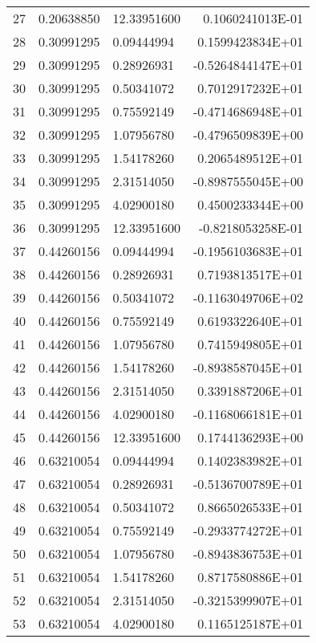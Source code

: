 \begin{longtable}{@{\extracolsep{\fill}}cllr@{}}
27  &  0.20638850  &  12.33951600  &   0.1060241013E-01 \\
28  &  0.30991295  &  0.09444994  &   0.1599423834E+01 \\
29  &  0.30991295  &  0.28926931  &  -0.5264844147E+01 \\
30  &  0.30991295  &  0.50341072  &   0.7012917232E+01 \\
31  &  0.30991295  &  0.75592149  &  -0.4714686948E+01 \\
32  &  0.30991295  &  1.07956780  &  -0.4796509839E+00 \\
33  &  0.30991295  &  1.54178260  &   0.2065489512E+01 \\
34  &  0.30991295  &  2.31514050  &  -0.8987555045E+00 \\
35  &  0.30991295  &  4.02900180  &   0.4500233344E+00 \\
36  &  0.30991295  &  12.33951600  &  -0.8218053258E-01 \\
37  &  0.44260156  &  0.09444994  &  -0.1956103683E+01 \\
38  &  0.44260156  &  0.28926931  &   0.7193813517E+01 \\
39  &  0.44260156  &  0.50341072  &  -0.1163049706E+02 \\
40  &  0.44260156  &  0.75592149  &   0.6193322640E+01 \\
41  &  0.44260156  &  1.07956780  &   0.7415949805E+01 \\
42  &  0.44260156  &  1.54178260  &  -0.8938587045E+01 \\
43  &  0.44260156  &  2.31514050  &   0.3391887206E+01 \\
44  &  0.44260156  &  4.02900180  &  -0.1168066181E+01 \\
45  &  0.44260156  &  12.33951600  &   0.1744136293E+00 \\
46  &  0.63210054  &  0.09444994  &   0.1402383982E+01 \\
47  &  0.63210054  &  0.28926931  &  -0.5136700789E+01 \\
48  &  0.63210054  &  0.50341072  &   0.8665026533E+01 \\
49  &  0.63210054  &  0.75592149  &  -0.2933774272E+01 \\
50  &  0.63210054  &  1.07956780  &  -0.8943836753E+01 \\
51  &  0.63210054  &  1.54178260  &   0.8717580886E+01 \\
52  &  0.63210054  &  2.31514050  &  -0.3215399907E+01 \\
53  &  0.63210054  &  4.02900180  &   0.1165125187E+01 \\

\end{longtable}

